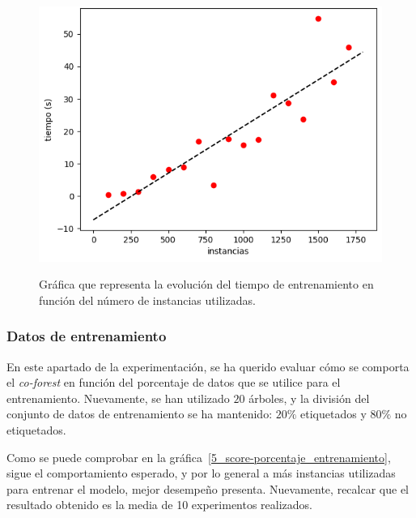 \begin{figure}[h]
	\caption{Gráfica que representa la evolución del tiempo de entrenamiento en función del número de instancias utilizadas.}
	\centering
	\includegraphics[scale=0.75]{../img/memoria/5_coforest_tiempo-instancias}
	\label{5_coforest_tiempo-instancias}
\end{figure}


\subsubsection{Datos de entrenamiento}

En este apartado de la experimentación, se ha querido evaluar cómo se comporta el \textit{co-forest} en función del porcentaje de datos que se utilice para el entrenamiento. Nuevamente, se han utilizado  $20$ árboles, y la división del conjunto de datos de entrenamiento se ha mantenido: $20\%$ etiquetados y $80\%$ no etiquetados.

Como se puede comprobar en la gráfica~\ref{5_score-porcentaje_entrenamiento}, sigue el comportamiento esperado, y por lo general a más instancias utilizadas para entrenar el modelo, mejor desempeño presenta. Nuevamente, recalcar que el resultado obtenido es la media de 10 experimentos realizados.


